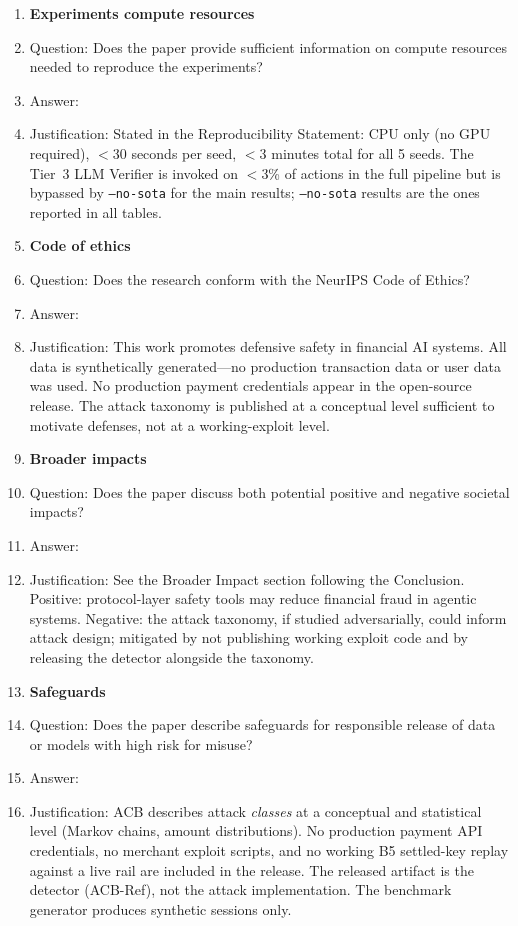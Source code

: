 \begin{enumerate}
\item {\bf Experiments compute resources}
    \item[] Question: Does the paper provide sufficient information on compute resources needed to reproduce the experiments?
    \item[] Answer: \answerYes{}
    \item[] Justification: Stated in the Reproducibility Statement: CPU only (no GPU required), $<$30 seconds per seed, $<$3 minutes total for all 5 seeds. The Tier~3 LLM Verifier is invoked on $<$3\% of actions in the full pipeline but is bypassed by \texttt{--no-sota} for the main results; \texttt{--no-sota} results are the ones reported in all tables.

\item {\bf Code of ethics}
    \item[] Question: Does the research conform with the NeurIPS Code of Ethics?
    \item[] Answer: \answerYes{}
    \item[] Justification: This work promotes defensive safety in financial AI systems. All data is synthetically generated---no production transaction data or user data was used. No production payment credentials appear in the open-source release. The attack taxonomy is published at a conceptual level sufficient to motivate defenses, not at a working-exploit level.

\item {\bf Broader impacts}
    \item[] Question: Does the paper discuss both potential positive and negative societal impacts?
    \item[] Answer: \answerYes{}
    \item[] Justification: See the Broader Impact section following the Conclusion. Positive: protocol-layer safety tools may reduce financial fraud in agentic systems. Negative: the attack taxonomy, if studied adversarially, could inform attack design; mitigated by not publishing working exploit code and by releasing the detector alongside the taxonomy.

\item {\bf Safeguards}
    \item[] Question: Does the paper describe safeguards for responsible release of data or models with high risk for misuse?
    \item[] Answer: \answerYes{}
    \item[] Justification: ACB describes attack \emph{classes} at a conceptual and statistical level (Markov chains, amount distributions). No production payment API credentials, no merchant exploit scripts, and no working B5 settled-key replay against a live rail are included in the release. The released artifact is the detector (ACB-Ref), not the attack implementation. The benchmark generator produces synthetic sessions only.


\end{enumerate}
